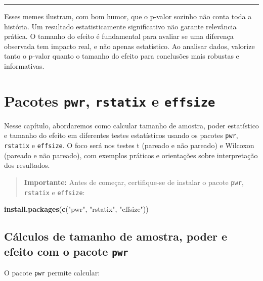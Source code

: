 \documentclass[
]{book}
\newenvironment{Shaded}{\begin{snugshade}}{\end{snugshade}}
\newcommand{\FunctionTok}[1]{\textcolor[rgb]{0.13,0.29,0.53}{\textbf{#1}}}
\newcommand{\NormalTok}[1]{#1}
\newcommand{\StringTok}[1]{\textcolor[rgb]{0.31,0.60,0.02}{#1}}
\begin{document}
\begin{center}\rule{0.5\linewidth}{0.5pt}\end{center}

Esses memes ilustram, com bom humor, que o p-valor sozinho não conta toda a história. Um resultado estatisticamente significativo não garante relevância prática. O tamanho do efeito é fundamental para avaliar se uma diferença observada tem impacto real, e não apenas estatístico. Ao analisar dados, valorize tanto o p-valor quanto o tamanho do efeito para conclusões mais robustas e informativas.

\chapter{\texorpdfstring{Pacotes \texttt{pwr}, \texttt{rstatix} e \texttt{effsize}}{Pacotes pwr, rstatix e effsize}}\label{pacotes-pwr-rstatix-e-effsize}

Nesse capítulo, abordaremos como calcular tamanho de amostra, poder estatístico e tamanho do efeito em diferentes testes estatísticos usando os pacotes \texttt{pwr}, \texttt{rstatix} e \texttt{effsize}. O foco será nos testes t (pareado e não pareado) e Wilcoxon (pareado e não pareado), com exemplos práticos e orientações sobre interpretação dos resultados.

\begin{quote}
\textbf{Importante:} Antes de começar, certifique-se de instalar o pacote \texttt{pwr}, \texttt{rstatix} e \texttt{effsize}:
\end{quote}

\begin{Shaded}
\begin{Highlighting}[]
\FunctionTok{install.packages}\NormalTok{(}\FunctionTok{c}\NormalTok{(}\StringTok{"pwr"}\NormalTok{, }\StringTok{"rstatix"}\NormalTok{, }\StringTok{"effsize"}\NormalTok{))}
\end{Highlighting}
\end{Shaded}

\section{\texorpdfstring{Cálculos de tamanho de amostra, poder e efeito com o pacote \texttt{pwr}}{Cálculos de tamanho de amostra, poder e efeito com o pacote pwr}}\label{cuxe1lculos-de-tamanho-de-amostra-poder-e-efeito-com-o-pacote-pwr}

O pacote \texttt{pwr} permite calcular:
\end{document}
